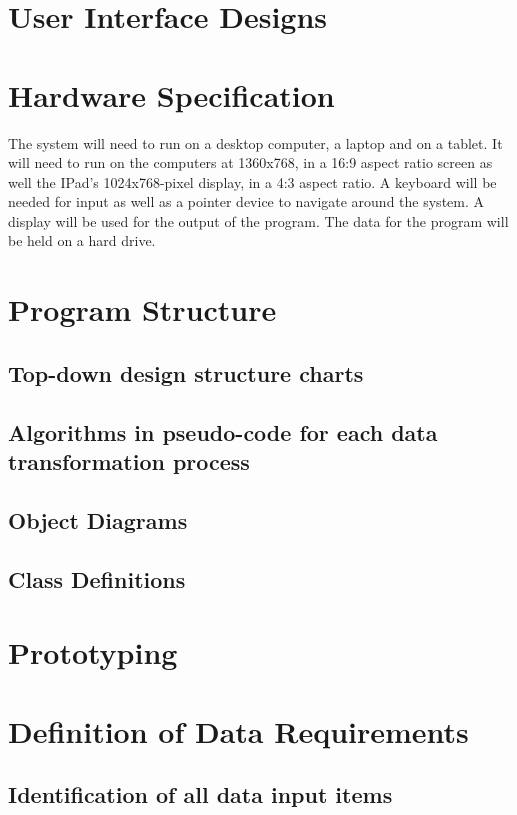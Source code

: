 \section{User Interface Designs}

\section{Hardware Specification}
The system will need to run on a desktop computer, a laptop and on a tablet. It will need to run on the computers at 1360x768, in a 16:9 aspect ratio screen as well the IPad's 1024x768-pixel display, in a 4:3 aspect ratio. A keyboard will be needed for input as well as a pointer device to navigate around the system. A display will be used for the output of the program. The data for the program will be held on a hard drive.
\section{Program Structure}

\subsection{Top-down design structure charts}

\subsection{Algorithms in pseudo-code for each data transformation process}

\subsection{Object Diagrams}

\subsection{Class Definitions}

\section{Prototyping}

\section{Definition of Data Requirements}

\subsection{Identification of all data input items}

